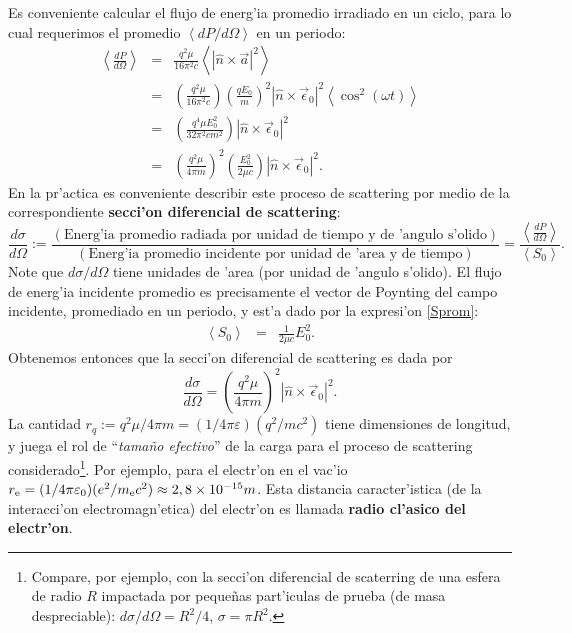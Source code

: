 Es conveniente calcular el flujo de energ'ia promedio irradiado en un ciclo,
para lo cual requerimos el promedio $\left\langle
{dP}/{d\Omega}\right\rangle$ en un periodo:
\begin{eqnarray}
\left\langle\frac{dP}{d\Omega}\right\rangle  &=&
\frac{q^2\mu}{16\pi^2 c}\left\langle |\hat{n}\times\vec{a}|^2\right\rangle \\
&=&\left(\frac{q^2\mu}{16\pi^2 c}\right)\left(\frac{qE_0}{m}\right)^2\left|
\hat{n}\times\vec{\epsilon}_0\right|^2\left\langle
\cos^2(\omega t)\right\rangle \\
&=&\left(\frac{q^4\mu E_0^2}{32\pi^2 c m^2}\right)\left|
\hat{n}\times\vec{\epsilon}_0\right|^2\\
&=&\left(\frac{q^2\mu}{4\pi m}\right)^2\left(\frac{E_0^2}{2\mu c}\right) \left|
\hat{n}\times\vec{\epsilon}_0\right|^2.
\end{eqnarray}
En la pr'actica es conveniente describir este proceso de scattering por medio de
la correspondiente  \textbf{secci'on diferencial de scattering}:
\begin{equation}
\frac{d\sigma}{d\Omega}:=\frac{\left( \text{Energ'ia promedio radiada por unidad
de tiempo y de 'angulo s'olido}\right) }{\left( \text{Energ'ia promedio
incidente por unidad de 'area y de tiempo}\right) }=\frac{\left\langle
\frac{dP}{d\Omega}\right\rangle}{\left\langle S_0\right\rangle}.
\end{equation}
Note que ${d\sigma}/{d\Omega}$ tiene unidades de 'area (por unidad de 'angulo
s'olido).
El flujo de energ'ia incidente promedio es precisamente el vector de Poynting
del campo incidente, promediado en un periodo, y est'a dado por la expresi'on \eqref{Sprom}:
\begin{eqnarray}
\left\langle S_0\right\rangle &=&\frac{1}{2\mu c}E_0^2.
\end{eqnarray}
Obtenemos entonces que la secci'on diferencial de scattering es dada por
\begin{equation}
\boxed{\frac{d\sigma}{d\Omega}  =\left(\frac{q^2\mu}{4\pi m}\right)^2\left|
\hat{n}\times\vec{\epsilon}_0\right|^2 .}\label{seeT}
\end{equation}
La cantidad $r_q:={q^2\mu}/{4\pi m}=(1/{4\pi\varepsilon})({q^2}/{mc^2})$ tiene dimensiones de longitud, y juega el rol de ``\textit{tama\~no efectivo}'' de la carga para el proceso de scattering considerado\footnote{Compare, por ejemplo, con la secci'on diferencial de scaterring de una esfera de radio $R$ impactada por peque\~nas part'iculas de prueba (de masa despreciable): $d\sigma/d\Omega=R^2/4$, $\sigma=\pi R^2$.}. Por ejemplo, para el electr'on en el vac'io $r_{\rm e}=(1/{4\pi\varepsilon_0})({e^2}/{m_{\rm e}c^2})\approx 2,8\times 10^{-15}m$. Esta distancia caracter'istica (de la interacci'on electromagn'etica) del electr'on es llamada \textbf{radio cl'asico del electr'on}.

